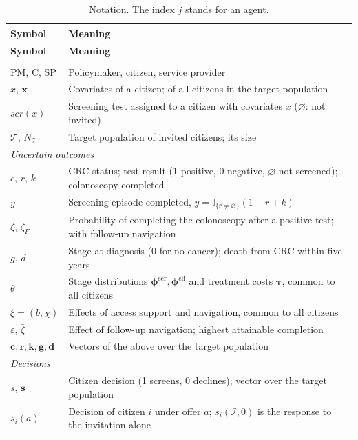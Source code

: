 \documentclass[12pt]{article}
\begin{document}
{\footnotesize
\renewcommand{\arraystretch}{1.0}
\begin{longtable}{l p{13.2cm}}
\caption{Notation. The index $j$ stands for an agent.}\label{tab:notation} \\
\toprule
\textbf{Symbol} & \textbf{Meaning} \\
\midrule
\endfirsthead
\toprule
\textbf{Symbol} & \textbf{Meaning} \\
\midrule
\endhead
\bottomrule
\endfoot
\multicolumn{2}{l}{\emph{Agents and population}} \\
PM, C, SP & Policymaker, citizen, service provider \\
$x$, $\mathbf{x}$ & Covariates of a citizen; of all citizens in the target population \\
$scr(x)$ & Screening test assigned to a citizen with covariates $x$ ($\varnothing$: not invited) \\
$\mathcal{T}$, $N_{\mathcal{T}}$ & Target population of invited citizens; its size \\
\midrule
\multicolumn{2}{l}{\emph{Uncertain outcomes}} \\
$c$, $r$, $k$ & CRC status; test result (1 positive, 0 negative, $\varnothing$ not screened); colonoscopy completed \\
$y$ & Screening episode completed, $y = \mathbb{I}_{\{r \neq \varnothing\}}(1 - r + k)$ \\
$\zeta$, $\zeta_F$ & Probability of completing the colonoscopy after a positive test; with follow-up navigation \\
$g$, $d$ & Stage at diagnosis (0 for no cancer); death from CRC within five years \\
$\theta$ & Stage distributions $\boldsymbol{\phi}^{\text{scr}}, \boldsymbol{\phi}^{\text{cli}}$ and treatment costs $\boldsymbol{\tau}$, common to all citizens \\
$\xi = (b, \chi)$ & Effects of access support and navigation, common to all citizens \\
$\varepsilon$, $\bar\zeta$ & Effect of follow-up navigation; highest attainable completion \\
$\mathbf{c}, \mathbf{r}, \mathbf{k}, \mathbf{g}, \mathbf{d}$ & Vectors of the above over the target population \\
\midrule
\multicolumn{2}{l}{\emph{Decisions}} \\
$s$, $\mathbf{s}$ & Citizen decision (1 screens, 0 declines); vector over the target population \\
$s_i(a)$ & Decision of citizen $i$ under offer $a$; $s_i(\mathcal{I}, 0)$ is the response to the invitation alone \\

\end{longtable}}
\end{document}
